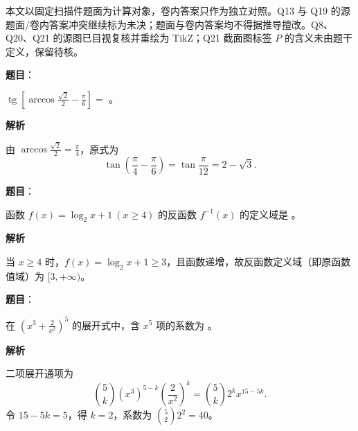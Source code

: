 

\begin{gktip}
本文以固定扫描件题面为计算对象，卷内答案只作为独立对照。Q13 与 Q19 的源题面/卷内答案冲突继续标为未决；题面与卷内答案均不得据推导擅改。Q8、Q20、Q21 的源图已目视复核并重绘为 TikZ；Q21 截面图标签 $P$ 的含义未由题干定义，保留待核。
\end{gktip}


\begin{answer}

\textbf{题目}：

$\operatorname{tg}\left[\arccos\frac{\sqrt2}{2}-\frac\pi6\right]=$ \gkblank{}。

\textbf{解析}

由 $\arccos\frac{\sqrt2}{2}=\frac\pi4$，原式为
\nopagebreak[4]
\[
\tan\left(\frac\pi4-\frac\pi6\right)=\tan\frac\pi{12}=2-\sqrt3.
\]


\end{answer}
\begin{answer}

\textbf{题目}：

函数 $f(x)=\log_2 x+1\ (x\ge4)$ 的反函数 $f^{-1}(x)$ 的定义域是 \gkblank{}。

\textbf{解析}

当 $x\ge4$ 时，$f(x)=\log_2x+1\ge3$，且函数递增，故反函数定义域（即原函数值域）为 $[3,+\infty)$。

\gkanswer{答案：$[3,+\infty)$（值域按数学定义不含 $+\infty$；扫描件右括号形似方括号）}

\end{answer}
\begin{answer}

\textbf{题目}：

在 $\left(x^3+\frac{2}{x^2}\right)^5$ 的展开式中，含 $x^5$ 项的系数为 \gkblank{}。

\textbf{解析}

二项展开通项为
\nopagebreak[4]
\[
\binom5k(x^3)^{5-k}\left(\frac2{x^2}\right)^k
=\binom5k2^k x^{15-5k}.
\]
令 $15-5k=5$，得 $k=2$，系数为 $\binom{5}{2}2^2=40$。


\end{answer}

